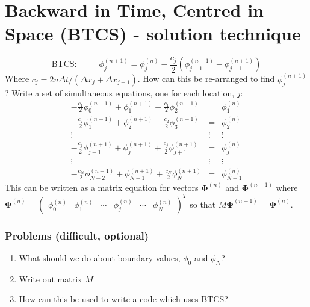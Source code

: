 \section{Backward in Time, Centred in Space (BTCS) - solution technique}

\begin{equation}
\text{BTCS:}~~~~~~~~~~~~\phi_{j}^{(n+1)}=\phi_{j}^{(n)}-\frac{c_{j}}{2}\left(\phi_{j+1}^{(n+1)}-\phi_{j-1}^{(n+1)}\right)\label{eqn:BTCS-2}
\end{equation}
Where $c_{j}=2u\Delta t/\left(\Delta x_{j}+\Delta x_{j+1}\right)$.
How can this be re-arranged to find $\phi_{j}^{(n+1)}$ ? Write a
set of simultaneous equations, one for each location, $j$:\pause 
\begin{eqnarray*}
-\frac{c_{1}}{2}\phi_{0}^{(n+1)}+\phi_{1}^{(n+1)}+\frac{c_{1}}{2}\phi_{2}^{(n+1)} & = & \phi_{1}^{(n)}\\
-\frac{c_{2}}{2}\phi_{1}^{(n+1)}+\phi_{2}^{(n+1)}+\frac{c_{2}}{2}\phi_{3}^{(n+1)} & = & \phi_{2}^{(n)}\\
\vdots & \vdots & \vdots\\
-\frac{c_{j}}{2}\phi_{j-1}^{(n+1)}+\phi_{j}^{(n+1)}+\frac{c_{j}}{2}\phi_{j+1}^{(n+1)} & = & \phi_{j}^{(n)}\\
\vdots & \vdots & \vdots\\
-\frac{c_{N}}{2}\phi_{N-2}^{(n+1)}+\phi_{N-1}^{(n+1)}+\frac{c_{N}}{2}\phi_{N}^{(n+1)} & = & \phi_{N-1}^{(n)}
\end{eqnarray*}
\pause This can be written as a matrix equation for vectors $\bm{\Phi}^{(n)}$
and $\bm{\Phi}^{(n+1)}$ where\\
 $\bm{\Phi}^{(n)}=\left(\begin{array}{cccccc}
\phi_{0}^{(n)} & \phi_{1}^{(n)} & \cdots & \phi_{j}^{(n)} & \cdots & \phi_{N}^{(n)}\end{array}\right)^{T}$ so that $M\bm{\Phi}^{(n+1)}=\bm{\Phi}^{(n)}.$


\subsubsection*{Problems (difficult, optional)}
\begin{enumerate}
\item What should we do about boundary values, $\phi_{0}$ and $\phi_{N}$?
\item Write out matrix $M$
\item How can this be used to write a code which uses BTCS?\end{enumerate}

